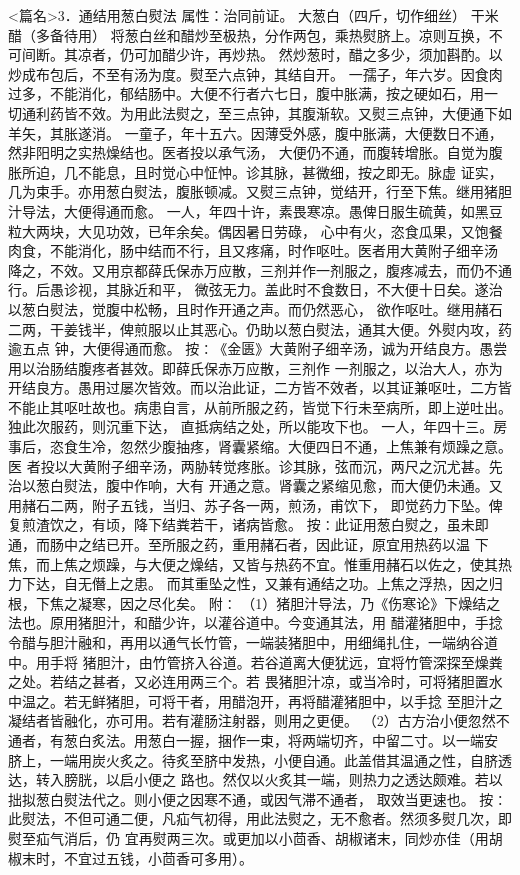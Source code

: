 \documentclass[a4paper,12pt,UTF8,twoside]{ctexbook}
\begin{document}
<篇名>3．通结用葱白熨法
属性：治同前证。 
大葱白（四斤，切作细丝） 干米醋（多备待用） 
将葱白丝和醋炒至极热，分作两包，乘热熨脐上。凉则互换，不可间断。其凉者，仍可加醋少许，再炒热。 
然炒葱时，醋之多少，须加斟酌。以炒成布包后，不至有汤为度。熨至六点钟，其结自开。 
一孺子，年六岁。因食肉过多，不能消化，郁结肠中。大便不行者六七日，腹中胀满，按之硬如石，用一 
切通利药皆不效。为用此法熨之，至三点钟，其腹渐软。又熨三点钟，大便通下如羊矢，其胀遂消。 
一童子，年十五六。因薄受外感，腹中胀满，大便数日不通，然非阳明之实热燥结也。医者投以承气汤， 
大便仍不通，而腹转增胀。自觉为腹胀所迫，几不能息，且时觉心中怔忡。诊其脉，甚微细，按之即无。脉虚 
证实，几为束手。亦用葱白熨法，腹胀顿减。又熨三点钟，觉结开，行至下焦。继用猪胆汁导法，大便得通而愈。 
一人，年四十许，素畏寒凉。愚俾日服生硫黄，如黑豆粒大两块，大见功效，已年余矣。偶因暑日劳碌， 
心中有火，恣食瓜果，又饱餐肉食，不能消化，肠中结而不行，且又疼痛，时作呕吐。医者用大黄附子细辛汤 
降之，不效。又用京都薛氏保赤万应散，三剂并作一剂服之，腹疼减去，而仍不通行。后愚诊视，其脉近和平， 
微弦无力。盖此时不食数日，不大便十日矣。遂治以葱白熨法，觉腹中松畅，且时作开通之声。而仍然恶心， 
欲作呕吐。继用赭石二两，干姜钱半，俾煎服以止其恶心。仍助以葱白熨法，通其大便。外熨内攻，药逾五点 
钟，大便得通而愈。 
按∶《金匮》大黄附子细辛汤，诚为开结良方。愚尝用以治肠结腹疼者甚效。即薛氏保赤万应散，三剂作 
一剂服之，以治大人，亦为开结良方。愚用过屡次皆效。而以治此证，二方皆不效者，以其证兼呕吐，二方皆 
不能止其呕吐故也。病患自言，从前所服之药，皆觉下行未至病所，即上逆吐出。独此次服药，则沉重下达， 
直抵病结之处，所以能攻下也。 
一人，年四十三。房事后，恣食生冷，忽然少腹抽疼，肾囊紧缩。大便四日不通，上焦兼有烦躁之意。医 
者投以大黄附子细辛汤，两胁转觉疼胀。诊其脉，弦而沉，两尺之沉尤甚。先治以葱白熨法，腹中作响，大有 
开通之意。肾囊之紧缩见愈，而大便仍未通。又用赭石二两，附子五钱，当归、苏子各一两，煎汤，甫饮下， 
即觉药力下坠。俾复煎渣饮之，有顷，降下结粪若干，诸病皆愈。 
按∶此证用葱白熨之，虽未即通，而肠中之结已开。至所服之药，重用赭石者，因此证，原宜用热药以温 
下焦，而上焦之烦躁，与大便之燥结，又皆与热药不宜。惟重用赭石以佐之，使其热力下达，自无僭上之患。 
而其重坠之性，又兼有通结之功。上焦之浮热，因之归根，下焦之凝寒，因之尽化矣。 
附∶ 
（1）猪胆汁导法，乃《伤寒论》下燥结之法也。原用猪胆汁，和醋少许，以灌谷道中。今变通其法，用 
醋灌猪胆中，手捻令醋与胆汁融和，再用以通气长竹管，一端装猪胆中，用细绳扎住，一端纳谷道中。用手将 
猪胆汁，由竹管挤入谷道。若谷道离大便犹远，宜将竹管深探至燥粪之处。若结之甚者，又必连用两三个。若 
畏猪胆汁凉，或当冷时，可将猪胆置水中温之。若无鲜猪胆，可将干者，用醋泡开，再将醋灌猪胆中，以手捻 
至胆汁之凝结者皆融化，亦可用。若有灌肠注射器，则用之更便。 
（2）古方治小便忽然不通者，有葱白炙法。用葱白一握，捆作一束，将两端切齐，中留二寸。以一端安 
脐上，一端用炭火炙之。待炙至脐中发热，小便自通。此盖借其温通之性，自脐透达，转入膀胱，以启小便之 
路也。然仅以火炙其一端，则热力之透达颇难。若以拙拟葱白熨法代之。则小便之因寒不通，或因气滞不通者， 
取效当更速也。 
按∶此熨法，不但可通二便，凡疝气初得，用此法熨之，无不愈者。然须多熨几次，即熨至疝气消后，仍 
宜再熨两三次。或更加以小茴香、胡椒诸末，同炒亦佳（用胡椒末时，不宜过五钱，小茴香可多用）。 
\end{document}
